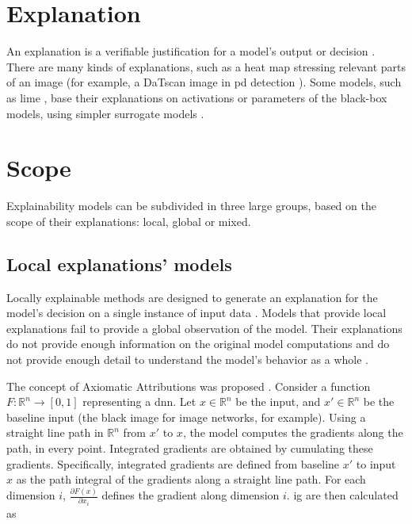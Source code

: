 
\section{Explanation}

An explanation is a verifiable justification for a model's output or decision \cite{XAI}. There are many kinds of explanations, such as a heat map stressing relevant parts of an image (for example, a DaTscan image in \gls{pd} detection \cite{LIME_explainability}). Some models, such as \gls{lime} \cite{LIME}, base their explanations on activations or parameters of the black-box models, using simpler surrogate models \cite{XAI}.


\section{Scope}

Explainability models can be subdivided in three large groups, based on the scope of their explanations: local, global or mixed.

\subsection{Local explanations' models}

Locally explainable methods are designed to generate an explanation for the model's decision on a single instance of input data \cite{XAI}. Models that provide local explanations fail to provide a global observation of the model. Their explanations do not provide enough information on the original model computations and do not provide enough detail to understand the model’s behavior as a whole \cite{NAM}. 

The concept of Axiomatic Attributions was proposed \cite{axiomatic_attribution}. Consider a function  $F : \mathbb{R} ^n \rightarrow [0, 1]$ representing a \gls{dnn}. Let $x \in \mathbb{R} ^n$ be the input, and $x' \in \mathbb{R} ^n$ be the baseline input (the black image for image networks, for example). Using a straight line path in $\mathbb{R} ^n$ from $x'$ to $x$, the model computes the gradients along the path, in every point. Integrated gradients are obtained by cumulating these gradients. Specifically, integrated gradients are defined from baseline $x'$ to input $x$ as the path integral of the gradients along a straight line path. For each dimension $i$, $\frac{\partial F(x)}{\partial x_i}$ defines the gradient along dimension $i$. \gls{ig} are then calculated as

